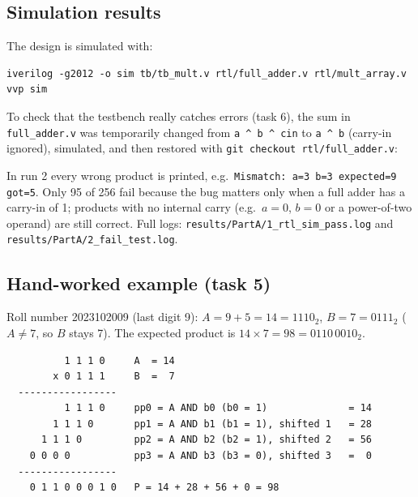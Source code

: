 \documentclass[10pt,a4paper,twocolumn]{article}
\begin{document}
\subsection{Simulation results}

The design is simulated with:
\begin{lstlisting}
iverilog -g2012 -o sim tb/tb_mult.v rtl/full_adder.v rtl/mult_array.v
vvp sim
\end{lstlisting}

To check that the testbench really catches errors (task 6), the sum in \texttt{full\_adder.v} was
temporarily changed from \texttt{a \^{} b \^{} cin} to \texttt{a \^{} b} (carry-in ignored), simulated, and then
restored with \texttt{git checkout rtl/full\_adder.v}:

\begin{table}[!htbp]
\centering
{}
\caption{RTL simulation results and the error-injection test.}
\end{table}

In run 2 every wrong product is printed, e.g.\ \texttt{Mismatch: a=3 b=3 expected=9 got=5}. Only 95 of 256
fail because the bug matters only when a full adder has a carry-in of 1; products with no internal carry
(e.g.\ $a = 0$, $b = 0$ or a power-of-two operand) are still correct. Full logs:
\texttt{results/PartA/1\_rtl\_sim\_pass.log} and \texttt{results/PartA/2\_fail\_test.log}.

\subsection{Hand-worked example (task 5)}

Roll number 2023102009 (last digit 9): $A = 9 + 5 = 14 = 1110_2$, $B = 7 = 0111_2$ ($A \neq 7$, so $B$ stays 7).
The expected product is $14 \times 7 = 98 = 0110\,0010_2$.

\begin{minipage}{\linewidth}
\begin{lstlisting}
          1 1 1 0     A  = 14
        x 0 1 1 1     B  =  7
  -----------------
          1 1 1 0     pp0 = A AND b0 (b0 = 1)              = 14
        1 1 1 0       pp1 = A AND b1 (b1 = 1), shifted 1   = 28
      1 1 1 0         pp2 = A AND b2 (b2 = 1), shifted 2   = 56
    0 0 0 0           pp3 = A AND b3 (b3 = 0), shifted 3   =  0
  -----------------
    0 1 1 0 0 0 1 0   P = 14 + 28 + 56 + 0 = 98
\end{lstlisting}
\end{minipage}
\end{document}

